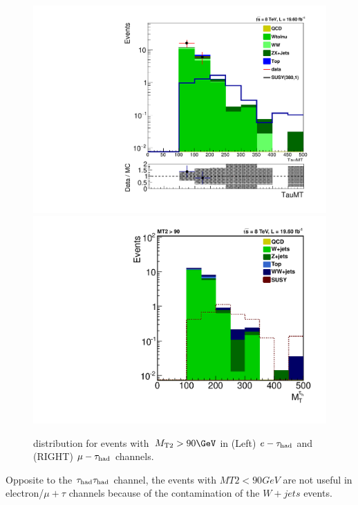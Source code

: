 \begin{figure}[htbp]
\centering
\includegraphics[angle=0,scale=0.35]{SelectionEleTau/TauMT.pdf}
\includegraphics[angle=0,scale=0.35]{SelectionMuTau/tauMT_MuTau.pdf}
\caption{\tauMT distribution for events with $\mttwo>90\GeV$ in (Left) $e-\tau_{\rm had}$ and (RIGHT) $\mu-\tau_{\rm had}$ channels.}
\label{fig:taumtleptontau}
\end{figure}

Opposite to the $\tau_{\rm had}\tau_{\rm had}$ channel, the events with $MT2<90 GeV$ are not useful in electron/$\mu + \tau$ channels because of the contamination of the $W+jets$ events.
